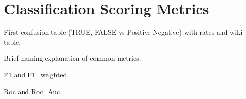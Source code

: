 \section{Classification Scoring Metrics}

First confusion table (TRUE, FALSE vs Positive Negative) with rates and wiki table.

Brief naming:explanation of common metrics.

F1 and F1_weighted.

Roc and Roc_Auc

